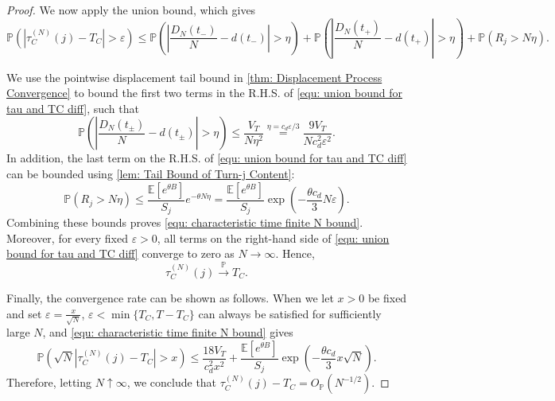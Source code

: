 \documentclass{article}
\theoremstyle{definition}
\newcommand{\E}{\mathbb E}
\newcommand{\pro}{\mathbb P}
\begin{document}
\begin{proof}
    We now apply the union bound, which gives
    \begin{equation}
        \label{equ: union bound for tau and TC diff}
        \pro\left(\left|\tau_C^{(N)}(j)-T_C\right|>\varepsilon\right)
        \leq\pro\left(\left|\frac{D_N(t_-)}{N}-d(t_-)\right|>\eta\right)+\pro\left(\left|\frac{D_N(t_+)}{N}-d(t_+)\right|>\eta\right)+\pro(R_j>N\eta).
    \end{equation}
    
    We use the pointwise displacement tail bound in \cref{thm: Displacement Process Convergence} to bound the first two terms in the R.H.S. of \eqref{equ: union bound for tau and TC diff}, such that
    \begin{equation*}
        \pro\left(\left|\frac{D_N(t_\pm)}{N}-d(t_\pm)\right|>\eta\right)\leq\frac{V_T}{N\eta^2} \stackrel{\eta=c_d\varepsilon/3}{=}\frac{9V_T}{N c_d^2\varepsilon^2}.
    \end{equation*}
    In addition, the last term on the R.H.S. of \eqref{equ: union bound for tau and TC diff} can be bounded using \cref{lem: Tail Bound of Turn-j Content}:
    \begin{equation*}
        \pro(R_j>N\eta)\leq\frac{\E[e^{\theta B}]}{S_j}e^{-\theta N\eta}=\frac{\E[e^{\theta B}]}{S_j}\exp\left(-\frac{\theta c_d}{3}N\varepsilon\right).
    \end{equation*}
    Combining these bounds proves \eqref{equ: characteristic time finite N bound}. Moreover, for every fixed $\varepsilon>0$, all terms on the right-hand side of \eqref{equ: union bound for tau and TC diff} converge to zero as $N\rightarrow\infty$. Hence,
    \begin{equation*}
        \tau_C^{(N)}(j)\xrightarrow{\mathbb P}T_C.
    \end{equation*}
    
    Finally, the convergence rate can be shown as follows. When we let $x>0$ be fixed and set $\varepsilon=\frac{x}{\sqrt N}$, $\varepsilon<\min\{T_C,T-T_C\}$ can always be satisfied for sufficiently large $N$, and \eqref{equ: characteristic time finite N bound} gives
    \begin{equation*}
        \pro\left(\sqrt N\left|\tau_C^{(N)}(j)-T_C\right|>x\right)\leq\frac{18V_T}{c_d^2x^2}+\frac{\E[e^{\theta B}]}{S_j}\exp\left(-\frac{\theta c_d}{3}x\sqrt N\right).
    \end{equation*}
    Therefore, letting $N \uparrow \infty$, we conclude that $\tau_C^{(N)}(j)-T_C=O_{\mathbb P}(N^{-1/2}).$
\end{proof}
\end{document}
